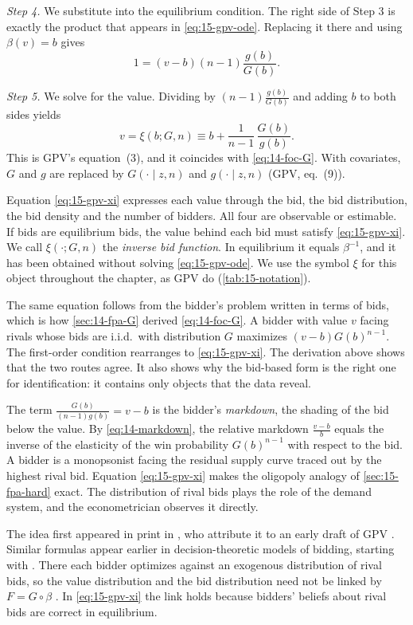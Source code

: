 \emph{Step 4.} We substitute into the equilibrium condition. The right side of Step 3 is exactly the product that appears in \eqref{eq:15-gpv-ode}. Replacing it there and using $\beta(v)=b$ gives
\[
1=(v-b)(n-1)\frac{g(b)}{G(b)}.
\]

\emph{Step 5.} We solve for the value. Dividing by $(n-1)\frac{g(b)}{G(b)}$ and adding $b$ to both sides yields
\begin{equation}\label{eq:15-gpv-xi}
v=\xi(b;G,n)\equiv b+\frac{1}{n-1}\,\frac{G(b)}{g(b)}.
\end{equation}
This is GPV's equation~(3), and it coincides with \eqref{eq:14-foc-G}. With covariates, $G$ and $g$ are replaced by $G(\cdot\mid z,n)$ and $g(\cdot\mid z,n)$ (GPV, eq.~(9)).

Equation \eqref{eq:15-gpv-xi} expresses each value through the bid, the bid distribution, the bid density and the number of bidders. All four are observable or estimable. If bids are equilibrium bids, the value behind each bid must satisfy \eqref{eq:15-gpv-xi}. We call $\xi(\cdot;G,n)$ the \emph{inverse bid function}. In equilibrium it equals $\beta^{-1}$, and it has been obtained without solving \eqref{eq:15-gpv-ode}. We use the symbol $\xi$ for this object throughout the chapter, as GPV do (\cref{tab:15-notation}).

The same equation follows from the bidder's problem written in terms of bids, which is how \cref{sec:14-fpa-G} derived \eqref{eq:14-foc-G}. A bidder with value $v$ facing rivals whose bids are i.i.d.\ with distribution $G$ maximizes $(v-b)G(b)^{n-1}$. The first-order condition rearranges to \eqref{eq:15-gpv-xi}. The derivation above shows that the two routes agree. It also shows why the bid-based form is the right one for identification: it contains only objects that the data reveal.

 The term $\frac{G(b)}{(n-1)g(b)}=v-b$ is the bidder's \emph{markdown}, the shading of the bid below the value. By \eqref{eq:14-markdown}, the relative markdown $\frac{v-b}{b}$ equals the inverse of the elasticity of the win probability $G(b)^{n-1}$ with respect to the bid. A bidder is a monopsonist facing the residual supply curve traced out by the highest rival bid. Equation \eqref{eq:15-gpv-xi} makes the oligopoly analogy of \cref{sec:15-fpa-hard} exact. The distribution of rival bids plays the role of the demand system, and the econometrician observes it directly.

 The idea first appeared in print in \citet{LaffontVuong1993}, who attribute it to an early draft of GPV \citep[Section 3.1]{AtheyHaile2007}. Similar formulas appear earlier in decision-theoretic models of bidding, starting with \citet{Friedman1956}. There each bidder optimizes against an exogenous distribution of rival bids, so the value distribution and the bid distribution need not be linked by $F=G\circ\beta$ \citep[footnote 3]{GuerrePerrigneVuong2000}. In \eqref{eq:15-gpv-xi} the link holds because bidders' beliefs about rival bids are correct in equilibrium.

